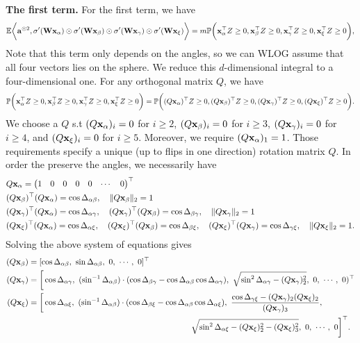 {\bf The first term.} For the first term, we have
\[
	{\mathbb{E}} \bigg\langle{\mathbf{a}}^{\odot 2},\sigma'({\mathbf{W}} {\mathbf{x}}_\alpha) \odot \sigma'({\mathbf{W}} {\mathbf{x}}_\beta) \odot \sigma'({\mathbf{W}} {\mathbf{x}}_\gamma) \odot \sigma'({\mathbf{W}} {\mathbf{x}}_\xi)   \bigg\rangle = m {\mathbb{P}} \bigg({\mathbf{x}}_\alpha^\top Z \geq 0,{\mathbf{x}}_\beta^\top Z \geq 0,{\mathbf{x}}_\gamma^\top Z \geq 0,{\mathbf{x}}_\xi^\top Z \geq 0\bigg),
\]
Note that this term only depends on the angles, so we can WLOG assume that all four vectors lies on the sphere. We reduce this $d$-dimensional integral to a four-dimensional one. For any orthogonal matrix $Q$, we have
\[
	{\mathbb{P}} \bigg({\mathbf{x}}_\alpha^\top Z \geq 0,{\mathbf{x}}_\beta^\top Z \geq 0,{\mathbf{x}}_\gamma^\top Z \geq 0,{\mathbf{x}}_\xi^\top Z \geq 0\bigg) = {\mathbb{P}} \bigg((Q{\mathbf{x}}_\alpha)^\top Z \geq 0, (Q{\mathbf{x}}_\beta)^\top Z \geq 0, (Q{\mathbf{x}}_\gamma)^\top Z \geq 0, (Q{\mathbf{x}}_\xi)^\top Z \geq 0\bigg).
\]
We choose a $Q$ s.t $(Q{\mathbf{x}}_{\alpha})_i = 0$ for $i \geq 2$, $(Q{\mathbf{x}}_\beta)_i = 0$ for $i \geq 3$, $(Q{\mathbf{x}}_\gamma)_i  = 0$ for $i \geq 4$, and $(Q{\mathbf{x}}_\xi)_i = 0$ for $i \geq 5$. Moreover, we require $(Q{\mathbf{x}}_\alpha)_1 =1$. Those requirements specify a unique (up to flips in one direction) rotation matrix $Q$. In order the preserve the angles, we necessarily have
\begin{align*}
	& Q\rvx_\alpha  = 
	\begin{pmatrix}
	1 & 0 & 0 & 0 & 0 & \cdots & 0
	\end{pmatrix}^\top \\
	& (Q\rvx_\beta)^\top (Q\rvx_\alpha)   = \cos\Delta_{\alpha\beta}, \ \ \  \|Q\rvx_\beta \|_2 = 1 \\
	& (Q\rvx_\gamma)^\top (Q\rvx_\alpha)  =  \cos\Delta_{\alpha\gamma} , \ \ \
	(Q\rvx_\gamma)^\top (Q\rvx_\beta)  = \cos \Delta_{\beta \gamma}, \ \ \  \|Q\rvx_\gamma \|_2 = 1\\
	& (Q\rvx_\xi)^\top (Q\rvx_\alpha)  = \cos \Delta_{\alpha\xi} , \ \ \ (Q\rvx_\xi)^\top (Q\rvx_\beta) = \cos \Delta_{\beta\xi} , \ \ \ (Q\rvx_\xi)^\top (Q\rvx_\gamma) = \cos \Delta_{\gamma\xi}, \ \ \ \| Q\rvx_\xi\|_2 = 1.
\end{align*}
Solving the above system of equations gives
\begin{align*}
	(Q\rvx_\beta) & = 
	[\cos\Delta_{\alpha \beta} , \ \sin\Delta_{\alpha\beta} , \  0 , \  \cdots, \  0]^\top \\
	(Q\rvx_\gamma) & = \bigg[
	\cos\Delta_{\alpha\gamma}   ,  \
	(\sin^{-1} \Delta_{\alpha\beta})\cdot ({\cos\Delta_{\beta\gamma} - \cos\Delta_{\alpha\beta}\cos\Delta_{\alpha\gamma}}), \ \sqrt{\sin^2\Delta_{\alpha\gamma} - (Q\rvx_\gamma)_2^2} , \ 0, \ \cdots, \ 0 )^\top \\
	(Q\rvx_\xi) & = \bigg[
	\cos\Delta_{\alpha\xi}, \
	(\sin^{-1} \Delta_{\alpha\beta})\cdot ({\cos\Delta_{\beta\xi} - \cos\Delta_{\alpha\beta}\cos\Delta_{\alpha\xi}}) , \ \frac{\cos\Delta_{\gamma\xi} - (Q\rvx_\gamma)_2 (Q\rvx_\xi)_2}{(Q\rvx_\gamma)_3} , \\
	& \qquad \qquad \qquad \qquad \qquad \qquad \qquad\qquad\qquad\qquad  \sqrt{\sin^2\Delta_{\alpha\xi} - (Q\rvx_\xi)_2^2 - (Q\rvx_\xi)_3^2}, \ 0, \ \cdots, \ 0
	\bigg]^\top.
\end{align*}
